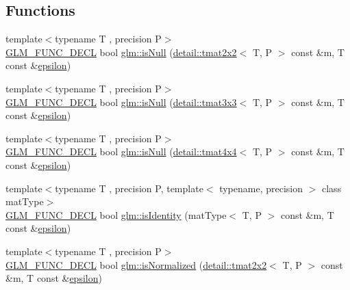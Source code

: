 \subsection*{Functions}
\begin{DoxyCompactItemize}
\item 
{\footnotesize template$<$typename T , precision P$>$ }\\\hyperlink{setup_8hpp_ab2d052de21a70539923e9bcbf6e83a51}{G\+L\+M\+\_\+\+F\+U\+N\+C\+\_\+\+D\+E\+CL} bool \hyperlink{group__gtx__matrix__query_gaf7e38680b67a3589a262d281660e4694}{glm\+::is\+Null} (\hyperlink{structglm_1_1detail_1_1tmat2x2}{detail\+::tmat2x2}$<$ T, P $>$ const \&m, T const \&\hyperlink{group__gtc__constants_gacb41049b8d22c8aa90e362b96c524feb}{epsilon})
\item 
{\footnotesize template$<$typename T , precision P$>$ }\\\hyperlink{setup_8hpp_ab2d052de21a70539923e9bcbf6e83a51}{G\+L\+M\+\_\+\+F\+U\+N\+C\+\_\+\+D\+E\+CL} bool \hyperlink{group__gtx__matrix__query_ga7a6ef9f174fec0224214ff5ba6c27ba4}{glm\+::is\+Null} (\hyperlink{structglm_1_1detail_1_1tmat3x3}{detail\+::tmat3x3}$<$ T, P $>$ const \&m, T const \&\hyperlink{group__gtc__constants_gacb41049b8d22c8aa90e362b96c524feb}{epsilon})
\item 
{\footnotesize template$<$typename T , precision P$>$ }\\\hyperlink{setup_8hpp_ab2d052de21a70539923e9bcbf6e83a51}{G\+L\+M\+\_\+\+F\+U\+N\+C\+\_\+\+D\+E\+CL} bool \hyperlink{group__gtx__matrix__query_ga5b8d7b0c7bf1d48ff8df10321440a61a}{glm\+::is\+Null} (\hyperlink{structglm_1_1detail_1_1tmat4x4}{detail\+::tmat4x4}$<$ T, P $>$ const \&m, T const \&\hyperlink{group__gtc__constants_gacb41049b8d22c8aa90e362b96c524feb}{epsilon})
\item 
{\footnotesize template$<$typename T , precision P, template$<$ typename, precision $>$ class mat\+Type$>$ }\\\hyperlink{setup_8hpp_ab2d052de21a70539923e9bcbf6e83a51}{G\+L\+M\+\_\+\+F\+U\+N\+C\+\_\+\+D\+E\+CL} bool \hyperlink{group__gtx__matrix__query_gafc1ce12c738b8c5d007179e615609330}{glm\+::is\+Identity} (mat\+Type$<$ T, P $>$ const \&m, T const \&\hyperlink{group__gtc__constants_gacb41049b8d22c8aa90e362b96c524feb}{epsilon})
\item 
{\footnotesize template$<$typename T , precision P$>$ }\\\hyperlink{setup_8hpp_ab2d052de21a70539923e9bcbf6e83a51}{G\+L\+M\+\_\+\+F\+U\+N\+C\+\_\+\+D\+E\+CL} bool \hyperlink{group__gtx__matrix__query_gaae7339fac94c86ed741f20b6915682ab}{glm\+::is\+Normalized} (\hyperlink{structglm_1_1detail_1_1tmat2x2}{detail\+::tmat2x2}$<$ T, P $>$ const \&m, T const \&\hyperlink{group__gtc__constants_gacb41049b8d22c8aa90e362b96c524feb}{epsilon})

\end{DoxyCompactItemize}
